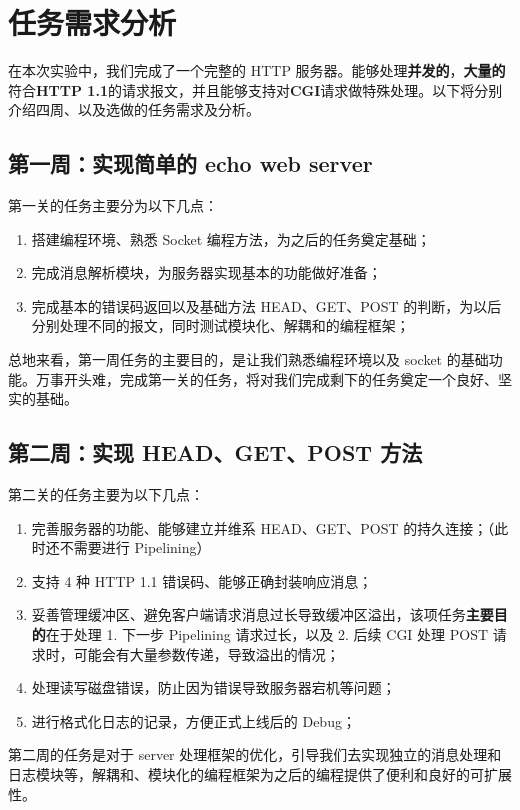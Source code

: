 
\chapter{任务需求分析}

在本次实验中，我们完成了一个完整的 HTTP 服务器。能够处理\textbf{并发的}，\textbf{大量的}符合\textbf{HTTP 1.1}的请求报文，并且能够支持对\textbf{CGI}请求做特殊处理。以下将分别介绍四周、以及选做的任务需求及分析。

\section{第一周：实现简单的 echo web server} 第一关的任务主要分为以下几点：
\begin{enumerate}
    \item 搭建编程环境、熟悉 Socket 编程方法，为之后的任务奠定基础；
    \item 完成消息解析模块，为服务器实现基本的功能做好准备；
    \item 完成基本的错误码返回以及基础方法 HEAD、GET、POST 的判断，为以后分别处理不同的报文，同时测试模块化、解耦和的编程框架；
\end{enumerate}
    

总地来看，第一周任务的主要目的，是让我们熟悉编程环境以及 socket 的基础功能。万事开头难，完成第一关的任务，将对我们完成剩下的任务奠定一个良好、坚实的基础。

\section{第二周：实现 HEAD、GET、POST 方法} 第二关的任务主要为以下几点：
\begin{enumerate}
    \item 完善服务器的功能、能够建立并维系 HEAD、GET、POST 的持久连接；（此时还不需要进行 Pipelining）
    \item 支持 4 种 HTTP 1.1 错误码、能够正确封装响应消息；
    \item 妥善管理缓冲区、避免客户端请求消息过长导致缓冲区溢出，该项任务\textbf{主要目的}在于处理 1. 下一步 Pipelining 请求过长，以及 2. 后续 CGI 处理 POST 请求时，可能会有大量参数传递，导致溢出的情况；
    \item 处理读写磁盘错误，防止因为错误导致服务器宕机等问题；
    \item 进行格式化日志的记录，方便正式上线后的 Debug；
\end{enumerate}

第二周的任务是对于 server 处理框架的优化，引导我们去实现独立的消息处理和日志模块等，解耦和、模块化的编程框架为之后的编程提供了便利和良好的可扩展性。

